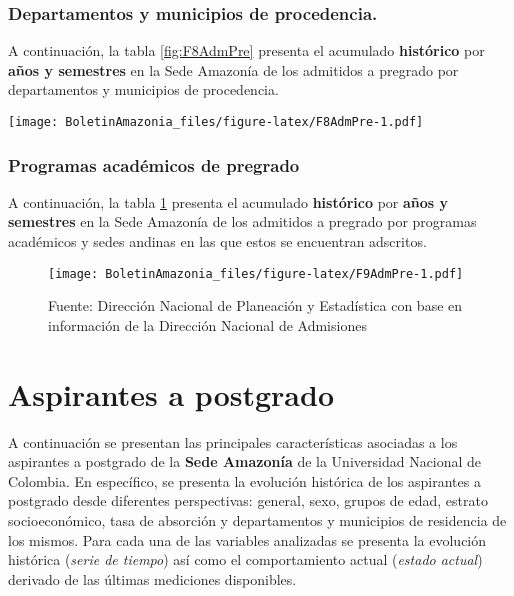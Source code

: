\documentclass[
]{book}
\begin{document}
\hypertarget{departamentos-y-municipios-de-procedencia.}{%
\subsubsection{Departamentos y municipios de procedencia.}\label{departamentos-y-municipios-de-procedencia.}}

A continuación, la tabla \ref{fig:F8AdmPre} presenta el acumulado \textbf{histórico} por \textbf{años y semestres} en la Sede Amazonía de los admitidos a pregrado por departamentos y municipios de procedencia.

\texttt{[image: BoletinAmazonia\_files/figure-latex/F8AdmPre-1.pdf]}

\hypertarget{programas-acaduxe9micos-de-pregrado}{%
\subsubsection{Programas académicos de pregrado}\label{programas-acaduxe9micos-de-pregrado}}

A continuación, la tabla \ref{fig:F9AdmPre} presenta el acumulado \textbf{histórico} por \textbf{años y semestres} en la Sede Amazonía de los admitidos a pregrado por programas académicos y sedes andinas en las que estos se encuentran adscritos.

\begin{figure}
\centering
\texttt{[image: BoletinAmazonia\_files/figure-latex/F9AdmPre-1.pdf]}
\caption{\label{fig:F9AdmPre}Fuente: Dirección Nacional de Planeación y Estadística con base en información de la Dirección Nacional de Admisiones}
\end{figure}

\hypertarget{AspPos}{%
\section{Aspirantes a postgrado}\label{AspPos}}

A continuación se presentan las principales características asociadas a los aspirantes a postgrado de la \textbf{Sede Amazonía} de la Universidad Nacional de Colombia. En específico, se presenta la evolución histórica de los aspirantes a postgrado desde diferentes perspectivas: general, sexo, grupos de edad, estrato socioeconómico, tasa de absorción y departamentos y municipios de residencia de los mismos. Para cada una de las variables analizadas se presenta la evolución histórica (\emph{serie de tiempo}) así como el comportamiento actual (\emph{estado actual}) derivado de las últimas mediciones disponibles.
\end{document}
